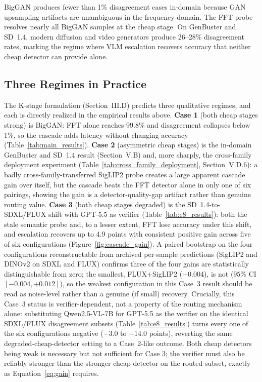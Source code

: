 \documentclass{ieeeaccess}
\begin{document}
BigGAN produces fewer than 1\% disagreement cases in-domain because GAN upsampling
artifacts are unambiguous in the frequency domain. The FFT probe resolves nearly all
BigGAN samples at the cheap stage. On GenBuster and SD~1.4, modern diffusion and
video generators produce 26--28\% disagreement rates, marking the regime where VLM
escalation recovers accuracy that neither cheap detector can provide alone.

\subsection{Three Regimes in Practice}
\label{sec:three_regimes}

The K-stage formulation (Section~III.D) predicts three qualitative regimes, and each is
directly realized in the empirical results above. \textbf{Case 1} (both cheap stages
strong) is BigGAN: FFT alone reaches 99.8\% and disagreement collapses below 1\%, so the
cascade adds latency without changing accuracy (Table~\ref{tab:main_results}). \textbf{Case 2}
(asymmetric cheap stages) is the in-domain GenBuster and SD~1.4 result (Section~V.B) and,
more sharply, the cross-family deployment experiment
(Table~\ref{tab:cross_family_deployment}, Section~V.D.6): a badly cross-family-transferred
SigLIP2 probe creates a large apparent cascade gain over itself, but the cascade beats the
FFT detector alone in only one of six pairings, showing the gain is a detector-quality-gap
artifact rather than genuine routing value. \textbf{Case 3} (both cheap stages degraded) is
the SD~1.4-to-SDXL/FLUX shift with GPT-5.5 as verifier (Table~\ref{tab:e8_results}): both
the stale semantic probe and, to a lesser extent, FFT lose accuracy under this shift, and
escalation recovers up to 4.9 points with consistent positive gain across five of six
configurations (Figure~\ref{fig:cascade_gain}). A paired bootstrap on the four
configurations reconstructable from archived per-sample predictions (SigLIP2 and
DINOv2 on SDXL and FLUX) confirms three of the four gains are statistically
distinguishable from zero; the smallest, FLUX+SigLIP2 ($+$0.004), is not
($95\%$ CI $[-0.004, +0.012]$), so the weakest configuration in this Case~3 result
should be read as noise-level rather than a genuine (if small) recovery. Crucially, this Case~3 status is
verifier-dependent, not a property of the routing mechanism alone: substituting Qwen2.5-VL-7B
for GPT-5.5 as the verifier on the identical SDXL/FLUX disagreement subsets
(Table~\ref{tab:e8_results}) turns every one of the six configurations negative
($-$3.0 to $-$14.0 points), reverting the same degraded-cheap-detector setting to a
Case~2-like outcome. Both cheap detectors being weak is necessary but not sufficient for
Case 3; the verifier must also be reliably stronger than the stronger cheap detector on
the routed subset, exactly as Equation~\eqref{eq:gain} requires.
\end{document}
